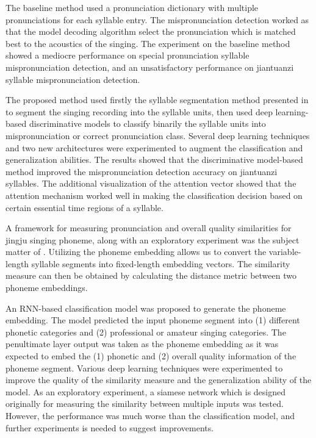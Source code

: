 The baseline method used a pronunciation dictionary with multiple pronunciations for each syllable entry. The mispronunciation detection worked as that the model decoding algorithm select the pronunciation which is matched best to the acoustics of the singing. The experiment on the baseline method showed a mediocre performance on special pronunciation syllable mispronunciation detection, and an unsatisfactory performance on jiantuanzi syllable mispronunciation detection.

The proposed method used firstly the syllable segmentation method presented in  to segment the singing recording into the syllable units, then used deep learning-based discriminative models to classify binarily the syllable units into mispronunciation or correct pronunciation class. Several deep learning techniques and two new architectures were experimented to augment the classification and generalization abilities. The results showed that the discriminative model-based method improved the mispronunciation detection accuracy on jiantuanzi syllables. The additional visualization of the attention vector showed that the attention mechanism worked well in making the classification decision based on certain essential time regions of a syllable.

A framework for measuring pronunciation and overall quality similarities for jingju singing phoneme, along with an exploratory experiment was the subject matter of . Utilizing the phoneme embedding allows us to convert the variable-length syllable segments into fixed-length embedding vectors. The similarity measure can then be obtained by calculating the distance metric between two phoneme embeddings. 

An RNN-based classification model was proposed to generate the phoneme embedding. The model predicted the input phoneme segment into (1) different phonetic categories and (2) professional or amateur singing categories. The penultimate layer output was taken as the phoneme embedding as it was expected to embed the (1) phonetic and (2) overall quality information of the phoneme segment. Various deep learning techniques were experimented to improve the quality of the similarity measure and the generalization ability of the model. As an exploratory experiment, a siamese network which is designed originally for measuring the similarity between multiple inputs was tested. However, the performance was much worse than the classification model, and further experiments is needed to suggest improvements.

